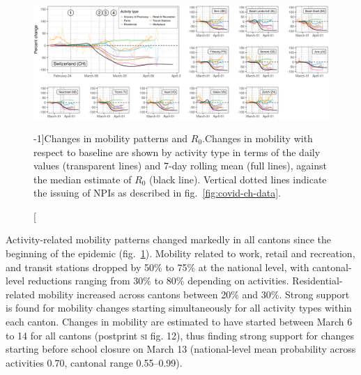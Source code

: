 \begin{figure}\centering
  \includegraphics{fig_covid-switzerland-npi/FIGURE_3.png}
  \caption[Changes in mobility patterns and $R_0$][-1\baselineskip]{Changes in mobility patterns and $R_0$.Changes in mobility with respect to baseline are shown by activity type in terms of the daily values (transparent lines) and 7-day rolling mean (full lines), against the median estimate of $R_0$ (black line). Vertical dotted lines indicate the issuing of NPIs as described in fig.~\ref{fig:covid-ch-data}.}
  \label{fig:covid-ch-mobility}
\end{figure}

Activity-related mobility patterns changed markedly in all cantons since the beginning of the epidemic (fig.~\ref{fig:covid-ch-mobility}). Mobility related to work, retail and recreation, and transit stations dropped by 50\% to 75\% at the national level, with cantonal-level reductions ranging from 30\% to 80\% depending on activities. Residential-related mobility increased across cantons between 20\% and 30\%. Strong support is found for mobility changes starting simultaneously for all activity types within each canton. Changes in mobility are estimated to have started between March 6 to 14 for all cantons (postprint \textsc{si} fig. 12), thus finding strong support for changes starting before school closure on March 13 (national-level mean probability across activities 0.70, cantonal range 0.55–0.99). 

